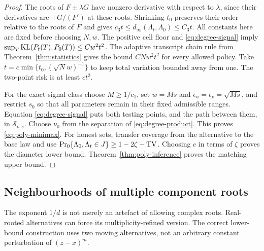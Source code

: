 \begin{proof}
The roots of $F\pm\lambda G$ have nonzero derivative with respect to
$\lambda$, since their derivatives are $\mp G/(F')$ at these roots.
Shrinking $t_0$ preserves their order relative to the roots of $F$ and
gives $c_3t\le d_\infty(\Lambda_t,\Lambda_0)\le C_3t$.
All constants here are fixed before choosing $N,w$.
The positive cell floor and \eqref{eq:degree-signal} imply
$\sup_T\operatorname{KL}(P_t(T),P_0(T))\le Cw^2t^2$. The adaptive transcript
chain rule from Theorem~\ref{thm:statistics} gives the bound
$CNw^2t^2$ for every allowed policy. Take
$t=c\min\{t_0,(\sqrt Nw)^{-1}\}$ to keep total variation bounded
away from one. The two-point risk is at least $ct^2$.

For the exact signal class choose $M\ge1/c_1$, set $w=Ms$ and
$\epsilon_u=\epsilon_v=\sqrt{Ms}$, and restrict $s_0$ so that all
parameters remain in their fixed admissible ranges. Equation
\eqref{eq:degree-signal} puts both testing points, and the path between
them, in $\mathcal S_{\nu,s}$. Choose $\nu_0$ from the separation of
\eqref{eq:degree-product}. This proves \eqref{eq:poly-minimax}.
For honest sets, transfer coverage from the alternative to the base
law and use
$\Pr_0\{\Lambda_0,\Lambda_t\in J\}\ge1-2\zeta-\operatorname{TV}$.
Choosing $c$ in terms of $\zeta$ proves the diameter lower bound.
Theorem~\ref{thm:poly-inference} proves the matching upper bound.
\end{proof}

\subsection{Neighbourhoods of multiple component roots}
The exponent $1/d$ is not merely an artefact of allowing complex roots.
Real-rooted alternatives can force its multiplicity-refined version.
The correct lower-bound construction uses two moving alternatives,
not an arbitrary constant perturbation of $(z-x)^m$.

